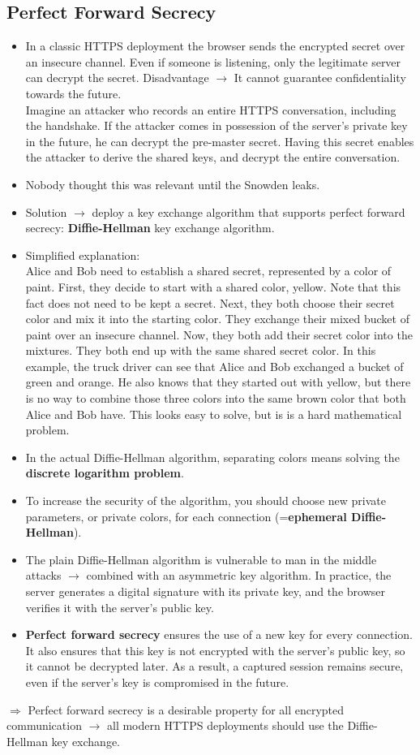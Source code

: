 \documentclass[../main.tex]{subfiles}
\begin{document}
\subsection{Perfect Forward Secrecy}
\begin{itemize}
\item In a classic HTTPS deployment the browser sends the encrypted secret over an insecure channel. Even if someone is listening, only the legitimate server can decrypt the secret. 
Disadvantage $\rightarrow$ It cannot guarantee confidentiality towards the future.\\
Imagine an attacker who records an entire HTTPS conversation, including the handshake. If the attacker comes in possession of the server's private key in the future, he can decrypt the pre-master secret. Having this secret enables the attacker to derive the shared keys, and decrypt the entire conversation.
\item Nobody thought this was relevant until the Snowden leaks.
\item Solution $\rightarrow$ deploy a key exchange algorithm that supports perfect forward secrecy: \textbf{Diffie-Hellman} key exchange algorithm.
\item Simplified explanation:\\
Alice and Bob need to establish a shared secret, represented by a color of paint. First, they decide to start with a shared color, yellow. Note that this fact does not need to be kept a secret. Next, they both choose their secret color and mix it into the starting color. They exchange their mixed bucket of paint over an insecure channel. Now, they both add their secret color into the mixtures. They both end up with the same shared secret color. In this example, the truck driver can see that Alice and Bob exchanged a bucket of green and orange. He also knows that they started out with yellow, but there is no way to combine those three colors into the same brown color that both Alice and Bob have. This looks easy to solve, but is is a hard mathematical problem.
\item In the actual Diffie-Hellman algorithm, separating colors means solving the \textbf{discrete logarithm problem}.
\item To increase the security of the algorithm, you should choose new private parameters, or private colors, for each connection (=\textbf{ephemeral Diffie-Hellman}).
\item The plain Diffie-Hellman algorithm is vulnerable to man in the middle attacks $\rightarrow$ combined with an asymmetric key algorithm. In practice, the server generates a digital signature with its private key, and the browser verifies it with the server's public key.
\item \textbf{Perfect forward secrecy} ensures the use of a new key for every connection. It also ensures that this key is not encrypted with the server's public key, so it cannot be decrypted later. As a result, a captured session remains secure, even if the server's key is compromised in the future.
\end{itemize}
$\Rightarrow$ Perfect forward secrecy is a desirable property for all encrypted communication $\rightarrow$ all modern HTTPS deployments should use the Diffie-Hellman key exchange.
\end{document}

